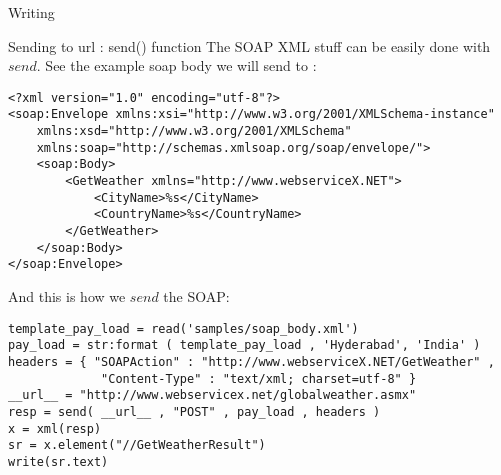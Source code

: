 \begin{section}{Writing}
\begin{subsection}{Sending to url : send() function}
The SOAP XML stuff can be easily done with $send$.
See the example soap body we  will send to :

\begin{lstlisting}[style=xmlStyle]
<?xml version="1.0" encoding="utf-8"?>
<soap:Envelope xmlns:xsi="http://www.w3.org/2001/XMLSchema-instance" 
	xmlns:xsd="http://www.w3.org/2001/XMLSchema" 
	xmlns:soap="http://schemas.xmlsoap.org/soap/envelope/">
    <soap:Body>
        <GetWeather xmlns="http://www.webserviceX.NET">
            <CityName>%s</CityName>
            <CountryName>%s</CountryName>
        </GetWeather>
    </soap:Body>
</soap:Envelope>
\end{lstlisting}

And this is how we $send$ the SOAP: 

\begin{center}\begin{minipage}{\linewidth}
\begin{lstlisting}[style=JexlStyle]
template_pay_load = read('samples/soap_body.xml')
pay_load = str:format ( template_pay_load , 'Hyderabad', 'India' )
headers = { "SOAPAction" : "http://www.webserviceX.NET/GetWeather" , 
             "Content-Type" : "text/xml; charset=utf-8" }
__url__ = "http://www.webservicex.net/globalweather.asmx"
resp = send( __url__ , "POST" , pay_load , headers ) 
x = xml(resp)
sr = x.element("//GetWeatherResult")
write(sr.text)
\end{lstlisting}
\end{minipage}\end{center}

\end{subsection}

\end{section}


